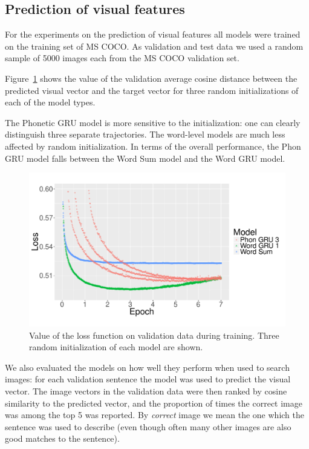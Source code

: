\subsection{Prediction of visual features}
\label{subsec:visual}
For the experiments on the prediction of visual features all models
were trained on the training set of MS COCO. As validation and test data we
used a random sample of 5000 images each from the MS COCO validation set. 

Figure~\ref{fig:loss} shows the value of the validation average cosine distance
between the predicted visual vector and the target vector for three
random initializations of each of the model types. 

The Phonetic GRU model is more sensitive to the initialization: one
can clearly distinguish three separate trajectories. The word-level models
are much less affected by random initialization. In terms of the
overall performance, the {\sc Phon GRU} model falls between the
{\sc Word Sum} model and the {\sc Word GRU} model.

\begin{figure}
  \centering
  \includegraphics[scale=0.3]{loss-zoom.pdf}
  \caption{Value of the loss function on validation data during
    training. Three random initialization of each model are shown.}
  \label{fig:loss}
\end{figure}

We also evaluated the models on how well they perform when used to
search images: for each validation sentence the model was used to predict the
visual vector. The image vectors in the validation data were then
ranked by cosine similarity to the predicted vector, and the
proportion of times the correct image was among the top 5 was
reported. By {\it correct} image we mean the one which the sentence
was used to describe (even though often many other images are also
good matches to the sentence). 

